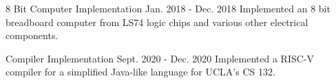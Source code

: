 

\begin{cventries}

  \cventry
    {} %
    {8 Bit Computer Implementation} %
    {} %
    {Jan. 2018 - Dec. 2018} %
    {
        Implemented an 8 bit breadboard computer from LS74 logic chips and various other electrical components. 
    }

  \cventry
    {} %
    {Compiler Implementation} %
    {} %
    {Sept. 2020 - Dec. 2020} %
    {
        Implemented a RISC-V compiler for a simplified Java-like language for UCLA's CS 132.
    }
    

\end{cventries}
